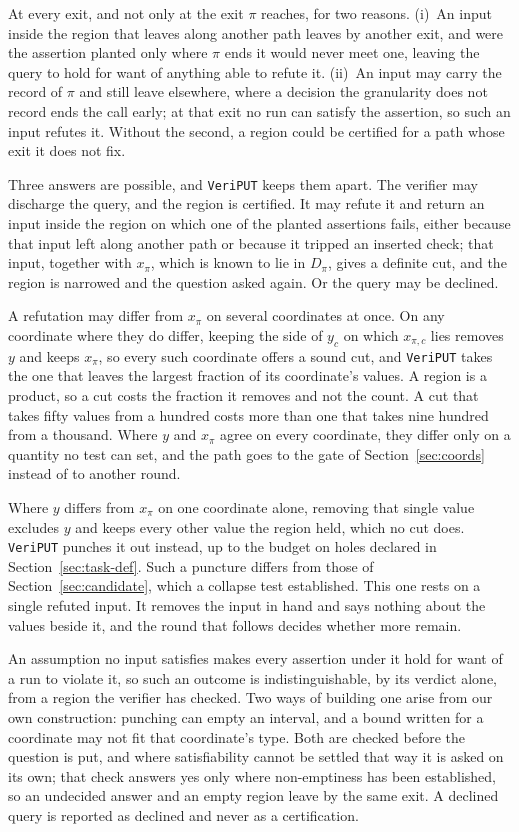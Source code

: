 \documentclass[manuscript,anonymous]{acmart}
\newcommand{\tool}[1]{\texttt{#1}}
\begin{document}
At every exit, and not only at the exit $\pi$ reaches, for two reasons.
(i)~An input inside the region that leaves along another path leaves by another
exit, and were the assertion planted only where $\pi$ ends it would never meet
one, leaving the query to hold for want of anything able to refute it. (ii)~An
input may carry the record of $\pi$ and still leave elsewhere, where a decision
the granularity does not record ends the call early; at that exit no run can
satisfy the assertion, so such an input refutes it. Without the second, a region
could be certified for a path whose exit it does not fix.

Three answers are possible, and \tool{VeriPUT} keeps them apart. The verifier may
discharge the query, and the region is certified. It may refute it and return an
input inside the region on which one of the planted assertions fails, either
because that input left along another path or because it tripped an inserted
check; that input, together with $x_\pi$, which is known to lie in $D_\pi$, gives
a definite cut, and the region is narrowed and the question asked again. Or the
query may be declined.

A refutation may differ from $x_\pi$ on several coordinates at once. On any
coordinate where they do differ, keeping
the side of $y_c$ on which $x_{\pi,c}$ lies removes $y$ and keeps $x_\pi$, so
every such coordinate offers a sound cut, and \tool{VeriPUT} takes the one that
leaves the largest fraction of its coordinate's values. A region is a product,
so a cut costs the fraction it removes and not the count. A cut that takes
fifty values from a hundred costs more than one that takes nine hundred from a
thousand.
Where $y$ and $x_\pi$ agree on every coordinate, they differ only on a quantity
no test can set, and the path goes to the gate of Section~\ref{sec:coords}
instead of to another round.

Where $y$ differs from $x_\pi$ on one coordinate alone, removing that single
value excludes $y$ and keeps every other value the region held, which no cut
does. \tool{VeriPUT} punches it out instead, up to the budget on holes declared
in Section~\ref{sec:task-def}. Such a puncture differs from those of
Section~\ref{sec:candidate}, which a collapse test established. This one rests
on a single refuted input. It removes the input in hand and says nothing about
the values beside it, and the round that follows decides whether more remain.

An assumption no input satisfies makes every assertion under it hold for want of
a run to violate it, so such an outcome is indistinguishable, by its verdict
alone, from a region the verifier has checked. Two ways of building one arise
from our own construction: punching can empty an interval, and a bound written
for a coordinate may not fit that coordinate's type. Both are checked before the
question is put, and where satisfiability cannot be settled that way it is asked
on its own; that check answers yes only where non-emptiness has been
established, so an undecided answer and an empty region leave by the same exit.
A declined query is reported as declined and never as a certification.
\end{document}
